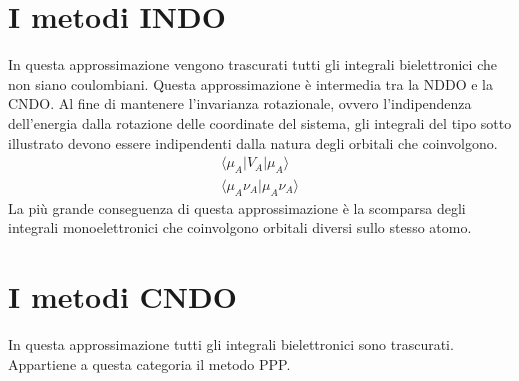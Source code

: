 \documentclass[oneside]{amsbook}
\numberwithin{section}{chapter}
\numberwithin{equation}{section}
\numberwithin{figure}{section}
\begin{document}
\section{I metodi INDO}	
In questa approssimazione vengono trascurati tutti gli integrali bielettronici che non siano coulombiani. Questa approssimazione è intermedia tra la NDDO e la CNDO.
Al fine di mantenere  l'invarianza rotazionale, ovvero l'indipendenza dell'energia dalla rotazione delle coordinate del sistema, gli integrali del tipo sotto illustrato devono essere indipendenti dalla natura degli orbitali che coinvolgono.
\begin{equation}
\begin{aligned}
\langle \mu_A \vert V_A\vert \mu_A \rangle \\
\langle \mu_A \nu_A \vert \mu_A \nu_A \rangle
\end{aligned}
\end{equation}
 La più grande conseguenza di questa approssimazione è la scomparsa degli integrali monoelettronici che coinvolgono orbitali diversi sullo stesso atomo.
\section{I metodi CNDO}
In questa approssimazione tutti gli integrali bielettronici sono trascurati. Appartiene a questa categoria il metodo PPP.
\end{document}
